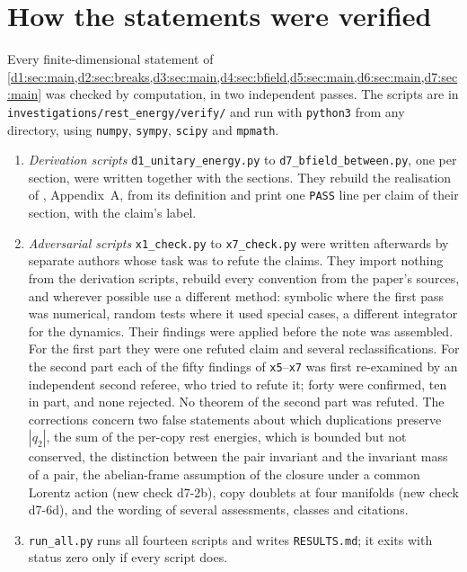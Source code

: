 \section{How the statements were verified}
\label{s9:sec:methods}

Every finite-dimensional statement of \cref{d1:sec:main,d2:sec:breaks,d3:sec:main,d4:sec:bfield,d5:sec:main,d6:sec:main,d7:sec:main} was
checked by computation, in two independent passes. The scripts are in \texttt{investigations/rest\_energy/verify/} and run with \texttt{python3} from any directory, using
\texttt{numpy}, \texttt{sympy}, \texttt{scipy} and \texttt{mpmath}.

\begin{enumerate}
\item \emph{Derivation scripts} \texttt{d1\_unitary\_energy.py} to \texttt{d7\_bfield\_between.py}, one per section, were
written together with the sections. They rebuild the realisation of \cite{ES17}, Appendix~A,
from its definition and print one \texttt{PASS} line per claim of their section, with the claim's label.
\item \emph{Adversarial scripts} \texttt{x1\_check.py} to \texttt{x7\_check.py} were written afterwards by separate authors whose task was to
refute the claims. They import nothing from the derivation scripts, rebuild every convention from the paper's sources, and wherever possible
use a different method: symbolic where the first pass was numerical, random tests where it used special cases, a different integrator for
the dynamics. Their findings were applied before the note was assembled. For the first part they were one refuted claim and several reclassifications.
For the second part each of the fifty findings of \texttt{x5}--\texttt{x7} was first re-examined by an independent second referee, who tried
to refute it; forty were confirmed, ten in part, and none rejected. No theorem of the second part was refuted. The corrections concern
two false statements about which duplications preserve $|q_2|$, the sum of the per-copy rest energies, which is bounded but not conserved,
the distinction between the pair invariant and the invariant mass of a pair, the abelian-frame assumption of the closure under a common
Lorentz action (new check d7-2b), copy doublets at four manifolds (new check d7-6d), and the wording of several assessments, classes and
citations.
\item \texttt{run\_all.py} runs all fourteen scripts and writes \texttt{RESULTS.md}; it exits with status zero only if every script does.
\end{enumerate}

